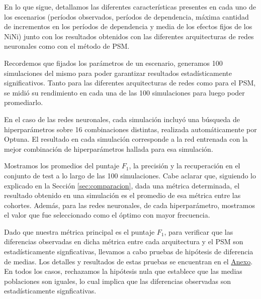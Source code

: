 \documentclass[../../main.tex]{subfiles}
\begin{document}
En lo que sigue, detallamos las diferentes características presentes en cada uno de los
escenarios (períodos observados, períodos de dependencia, máxima cantidad de incrementos
en los períodos de dependencia y media de los efectos fijos de los NiNi) junto con los
resultados obtenidos con las diferentes arquitecturas de redes neuronales como con el
método de PSM.

Recordemos que fijados los parámetros de un escenario, generamos 100 simulaciones
del mismo para poder garantizar resultados estadísticamente significativos. Tanto para
las diferentes arquitecturas de redes como para el PSM, se midió su rendimiento en
cada una de las 100 simulaciones para luego poder promediarlo.

En el caso de las redes neuronales, cada simulación incluyó una búsqueda de
hiperparámetros sobre 16 combinaciones distintas, realizada automáticamente por Optuna. El
resultado en cada simulación corresponde a la red entrenada con la mejor combinación de
hiperparámetros hallada para esa simulación.

Mostramos los promedios del puntaje \(F_1\), la precisión y la recuperación en el conjunto
de test a lo largo de las 100 simulaciones. Cabe aclarar que, siguiendo lo explicado en la
Sección \ref{sec:comparacion}, dada una métrica determinada, el resultado obtenido en una
simulación es el promedio de esa métrica entre las cohortes. Además, para las redes
neuronales, de cada hiperparámetro, mostramos el valor que fue seleccionado como el óptimo
con mayor frecuencia.

Dado que nuestra métrica principal es el puntaje \(F_1\), para verificar que las
diferencias observadas en dicha métrica entre cada arquitectura y el PSM son
estadísticamente signficativas, llevamos a cabo pruebas de hipótesis de diferencia de
medias. Los detalles y resultados de estas pruebas se encuentran en el
\hyperref[chap:anexo]{Anexo}. En todos los casos, rechazamos la hipótesis nula que
establece que las medias poblaciones son iguales, lo cual implica que las diferencias
observadas son estadísticamente signficativas.

\end{document}
